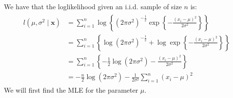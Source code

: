 \documentclass[letterpaper,10pt,english]{jupyterBook}
\begin{document}
\sphinxAtStartPar
We have that the log\sphinxhyphen{}likelihood given an i.i.d. sample of size \(n\) is:
\begin{equation*}
\begin{split}
\begin{align}
l \left(\mu, \sigma^2 \mid  \boldsymbol{x}  \right) &=  \sum_{i=1}^n \log \left\{ (2 \pi \sigma^2)^{-\frac{1}{2}} \exp \left\{-\frac{(x_i-\mu)^2}{2\sigma^2} \right\} \right\} \\
&= \sum_{i=1}^n \left\{ \log (2 \pi \sigma^2)^{-\frac{1}{2}}+ \log \exp  \left\{-\frac{(x_i-\mu)^2}{2\sigma^2} \right\}  \right\} \\
&= \sum_{i=1}^n \left\{ -\frac{1}{2} \log (2 \pi \sigma^2) - \frac{(x_i-\mu)^2}{2\sigma^2}  \right\} \\
&=  {-\frac{n}{2}}\log (2 \pi \sigma^2) -\frac{1}{2\sigma^2} \sum_{i=1}^n (x_i-\mu)^2 
\end{align}
\end{split}
\end{equation*}
\sphinxAtStartPar
We will first find the MLE for the parameter \(\mu\).
\end{document}
